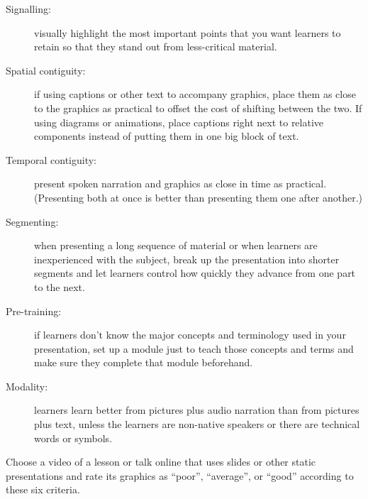 \begin{description}

\item[Signalling:]
  visually highlight the most important points that you want learners to retain
  so that they stand out from less-critical material.

\item[Spatial contiguity:]
  if using captions or other text to accompany graphics,
  place them as close to the graphics as practical to offset the cost of shifting between the two.
  If using diagrams or animations,
  place captions right next to relative components instead of putting them in one big block of text.

\item[Temporal contiguity:]
  present spoken narration and graphics as close in time as practical.
  (Presenting both at once is better than presenting them one after another.)

\item[Segmenting:]
  when presenting a long sequence of material or when learners are inexperienced with the subject,
  break up the presentation into shorter segments
  and let learners control how quickly they advance from one part to the next.

\item[Pre-training:]
  if learners don't know the major concepts and terminology used in your presentation,
  set up a module just to teach those concepts and terms and make sure they complete that module beforehand.

\item[Modality:]
  learners learn better from pictures plus audio narration than from pictures plus text,
  unless the learners are non-native speakers
  or there are technical words or symbols.

\end{description}

Choose a video of a lesson or talk online that uses slides or other static presentations
and rate its graphics as ``poor'', ``average'', or ``good'' according to these six criteria.
